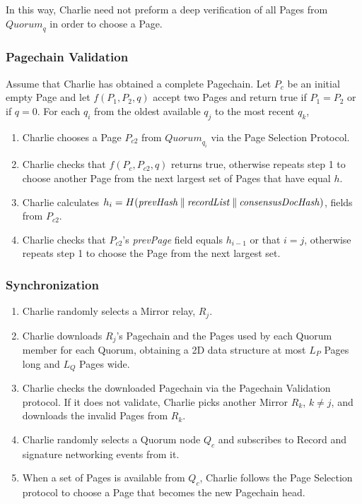 In this way, Charlie need not preform a deep verification of all Pages from $ \mathit{Quorum}_{q} $ in order to choose a Page.

\subsubsection{Pagechain Validation}

Assume that Charlie has obtained a complete Pagechain. Let $ P_{c} $ be an initial empty Page and let $ f(P_{1}, P_{2}, q) $ accept two Pages and return true if $ P_{1} = P_{2} $ or if $ q = 0 $. For each $ q_{i} $ from the oldest available $ q_{j} $ to the most recent $ q_{k} $,

\begin{enumerate}
	\item Charlie chooses a Page $ P_{c2} $ from $ \mathit{Quorum}_{q_{i}} $ via the Page Selection Protocol.
	\item Charlie checks that $ f(P_{c}, P_{c2}, q) $ returns true, otherwise repeats step 1 to choose another Page from the next largest set of Pages that have equal $ h $.
	\item Charlie calculates $ h_{i} = H(\mathit{prevHash} \mathbin{\|} \mathit{recordList} \mathbin{\|} \mathit{consensusDocHash}) $, fields from $ P_{c2} $.
	\item Charlie checks that $ P_{c2} $'s \emph{prevPage} field equals $ h_{i-1} $ or that $ i = j $, otherwise repeats step 1 to choose the Page from the next largest set.
\end{enumerate}

\subsubsection{Synchronization}
\label{sec:Synchronization}

\begin{enumerate}
	\item Charlie randomly selects a Mirror relay, $ R_{j} $.
	\item Charlie downloads $ R_{j} $'s Pagechain and the Pages used by each Quorum member for each Quorum, obtaining a 2D data structure at most $ L_{P} $ Pages long and $ L_{Q} $ Pages wide.
	\item Charlie checks the downloaded Pagechain via the Pagechain Validation protocol. If it does not validate, Charlie picks another Mirror $ R_{k} $, $ k \ne j $, and downloads the invalid Pages from $ R_{k} $.
	\item Charlie randomly selects a Quorum node $ Q_{c} $ and subscribes to Record and signature networking events from it.
	\item When a set of Pages is available from $ Q_{c} $, Charlie follows the Page Selection protocol to choose a Page that becomes the new Pagechain head.
\end{enumerate}

